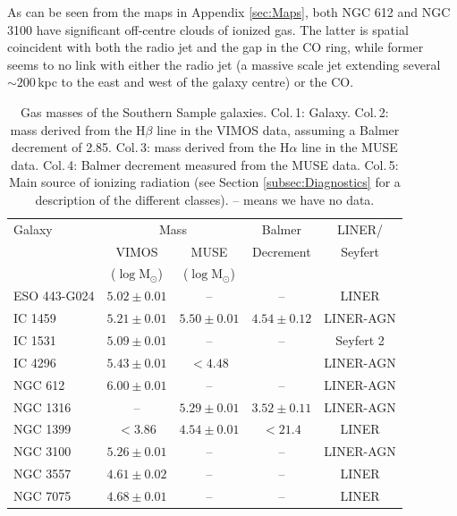 \documentclass[a4paper,fleqn,usenatbib]{mnras}
\begin{document}
	As can be seen from the maps in Appendix \ref{sec:Maps}, both NGC 612 and NGC 3100 have significant off-centre clouds of ionized gas. The latter is spatial coincident with both the radio jet and the gap in the CO ring, while former seems to no link with either the radio jet (a massive scale jet extending several $\sim 200$\,kpc to the east and west of the galaxy centre) or the CO. 


	\begin{table}
		\centering
		\caption{Gas masses of the Southern Sample galaxies. Col.\,1: Galaxy. Col.\,2:  mass derived from the H$\beta$ line in the VIMOS data, assuming a Balmer decrement of 2.85. Col.\,3:  mass derived from the H$\alpha$ line in the MUSE data. Col.\,4: Balmer decrement measured from the MUSE data. Col.\,5: Main source of ionizing radiation (see Section \ref{subsec:Diagnostics} for a description of the different classes). -- means we have no data.}
		\label{tab:gasMass}
		\begin{tabular}{l c c c c}
			\hline
			\hline
			Galaxy & \multicolumn{2}{c}{\ion{H}{ii} Mass} & Balmer & LINER/ \\
			& VIMOS\tnote{a} & MUSE & Decrement & Seyfert \\
			& ($\log\mathrm{M_\odot}$) & ($\log\mathrm{M_\odot}$) & \\
			\hline
			ESO 443-G024 & $5.02 \pm 0.01$ 	& --  		& -- & LINER \\
			IC 1459 	& $5.21 \pm 0.01$	& $5.50 \pm 0.01$ & $4.54 \pm 0.12$ & LINER-AGN\\
			IC 1531 	& $5.09 \pm 0.01$	& -- 		& -- & Seyfert 2\\
			IC 4296		& $5.43 \pm 0.01$	& $< 4.48$ 	& \tnote{b} & LINER-AGN \\
			NGC 612 	& $6.00 \pm 0.01$ 	& -- 		& -- & LINER-AGN \\
			NGC 1316 	& -- 				& $ 5.29 \pm 0.01$ & $3.52 \pm 0.11$ & LINER-AGN \\
			NGC 1399 	& $< 3.86$ 			& $ 4.54 \pm 0.01$ & $< 21.4$\tnote{c} & LINER \\
			NGC 3100 	& $5.26 \pm 0.01$	& -- 		& -- & LINER-AGN \\
			NGC 3557 	& $4.61 \pm 0.02$ 	& -- 		& -- & LINER \\
			NGC 7075 	& $4.68 \pm 0.01$	& -- 		& -- & LINER \\

\end{tabular}
\end{table}
\end{document}
